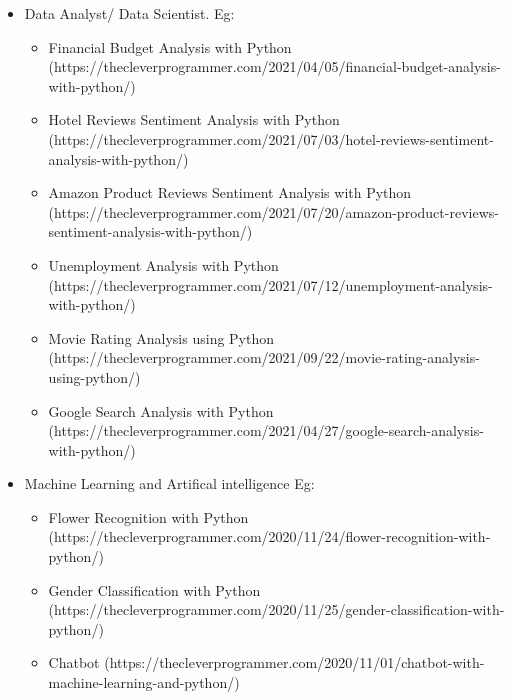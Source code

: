 \begin{flushleft}
\begin{itemize}
			\item Data Analyst/ Data Scientist. Eg:
			\begin{itemize}
				\item Financial Budget Analysis with Python (https://thecleverprogrammer.com/2021/04/05/financial-budget-analysis-with-python/)
				\item Hotel Reviews Sentiment Analysis with Python (https://thecleverprogrammer.com/2021/07/03/hotel-reviews-sentiment-analysis-with-python/)
				\item Amazon Product Reviews Sentiment Analysis with Python (https://thecleverprogrammer.com/2021/07/20/amazon-product-reviews-sentiment-analysis-with-python/)
				\item Unemployment Analysis with Python (https://thecleverprogrammer.com/2021/07/12/unemployment-analysis-with-python/)
				\item Movie Rating Analysis using Python (https://thecleverprogrammer.com/2021/09/22/movie-rating-analysis-using-python/)
				\item Google Search Analysis with Python (https://thecleverprogrammer.com/2021/04/27/google-search-analysis-with-python/)
			\end{itemize}
	
			\item Machine Learning and Artifical intelligence Eg:
			\begin{itemize}
				\item Flower Recognition with Python (https://thecleverprogrammer.com/2020/11/24/flower-recognition-with-python/)
				\item Gender Classification with Python
				(https://thecleverprogrammer.com/2020/11/25/gender-classification-with-python/)
				\item Chatbot (https://thecleverprogrammer.com/2020/11/01/chatbot-with-machine-learning-and-python/)
			\end{itemize}
			
		\end{itemize}
		
\end{flushleft}


\newpage



